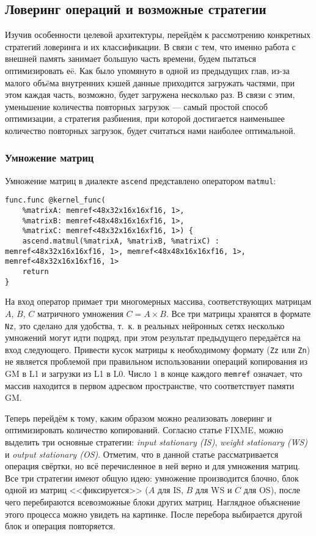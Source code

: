 \subsection{Ловеринг операций и возможные стратегии}
\label{impl:lowering} %

\newcommand{\divisible}{\mathop{\raisebox{-2pt}{\vdots}}}

Изучив особенности целевой архитектуры, перейдём к рассмотрению
конкретных стратегий ловеринга и их классификации. В связи с тем, что именно
работа с внешней память занимает большую часть времени, будем пытаться
оптимизировать еë. Как было упомянуто в одной из предыдущих глав, из-за малого
объëма внутренних кэшей данные приходится загружать частями, при этом каждая часть,
возможно, будет загружена несколько раз. В связи с этим, уменьшение количества
повторных загрузок --- самый простой способ оптимизации, а стратегия разбиения,
при которой достигается наименьшее количество повторных загрузок, будет считаться
нами наиболее оптимальной.

\subsubsection{Умножение матриц}

Умножение матриц в диалекте \texttt{ascend} представлено оператором \texttt{matmul}:

\begin{lstlisting}
func.func @kernel_func(
    %matrixA: memref<48x32x16x16xf16, 1>,
    %matrixB: memref<48x48x16x16xf16, 1>,
    %matrixC: memref<48x32x16x16xf16, 1>) {
    ascend.matmul(%matrixA, %matrixB, %matrixC) : memref<48x32x16x16xf16, 1>, memref<48x48x16x16xf16, 1>, memref<48x32x16x16xf16, 1>
    return
}
\end{lstlisting}

На вход оператор примает три многомерных массива, соответствующих матрицам
$A$, $B$, $C$ матричного умножения $C = A \times B$. Все три матрицы хранятся
в формате \texttt{Nz}, это сделано для удобства, т.~к. в реальных нейронных сетях
несколько умножений могут идти подряд, при этом результат предыдущего
передаётся на вход следующего. Привести кусок матрицы к необходимому формату
(\texttt{Zz} или \texttt{Zn}) не является проблемой при правильном использовании
операций копирования из GM в L1 и загрузки из L1 в L0. Число $1$ в конце каждого
\texttt{memref} означает, что массив находится в первом адресвом пространстве, что
соответствует памяти GM.

Теперь перейдём к тому, каким образом можно реализовать ловеринг и
оптимизировать количество копирований. Согласно статье FIXME, можно выделить
три основные стратегии: \textit{input stationary (IS)}, \textit{weight stationary (WS)}
и \textit{output stationary (OS)}. Отметим, что в данной статье рассматривается
операция свёртки, но всё перечисленное в ней верно и для умножения матриц.
Все три стратегии имеют общую идею: умножение производится блочно, блок одной из
матриц <<фиксируется>> ($A$ для IS, $B$ для WS и $C$ для OS), после чего
перебираются всевозможные блоки других матриц. Наглядное объяснение этого
процесса можно увидеть на картинке. После перебора выбирается другой блок и
операция повторяется.

